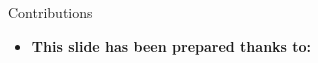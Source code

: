 \documentclass[serif, aspectratio=169]{beamer}
\begin{document}
\begin{frame}{Contributions}
\begin{itemize}
\item \textbf{This slide has been prepared thanks to:}
\begin{itemize}
\end{itemize}
\end{itemize}

\end{frame}

\begin{frame}[allowframebreaks]
    
    
    \nocite{*}
\end{frame}
\end{document}
